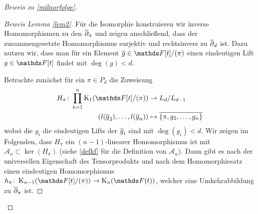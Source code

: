 \documentclass[ngerman,fontsize=11pt, paper=a4, parskip=half, titlepage=true, toc=bib]{scrartcl}
\begin{document}
\begin{proof}[Beweis zu \ref{milnorfolge}]
\begin{proof}[Beweis Lemma \ref{lem2}]
    Für die Isomorphie konstruieren wir inverse Homomorphismen 
    zu den $\overline\partial_\pi$ und zeigen anschließend, 
    dass der zusammengesetzte Homomorphismus surjektiv und
    rechtsinvers zu $\overline\partial_d$ ist.
    Dazu nutzen wir, dass man für ein Element $\ov g\in\Ftpi$ einen
    eindeutigen Lift $g\in\F[t]$ findet mit $\deg(g)<d$.
    
    Betrachte zunächst für ein $\pi\in P_d$ die Zuweisung
    \begin{align*}
      H_\pi\colon\prod_{k=1}^n \K_1(\Ftpi) 
      &\to L_d/L_{d-1}\\
      \left( l(\ov g_2),\dotsc, l(\ov g_n) \right)
      &\mapsto \ov{\{\pi,g_2,\dotsc,g_n\}}
    \end{align*}
    wobei die $g_i$ die eindeutigen Lifts der $\overline g_i$ sind mit $\deg(g_i)<d$.
    Wir zeigen im Folgenden, dass $H_\pi$ ein $(n-1)$-linearer
    Homomorphismus ist mit $\mathcal{A}_n\subset \ker(H_\pi)$ (siehe
    \ref{defkf} für die Definition von $\mathcal{A}_n$).
    Dann gibt es nach der universellen Eigenschaft des Tensorprodukts
    und nach dem Homomorphiesatz einen eindeutigen Homomorphismus 
    $h_\pi\colon\K_{n-1}(\Ftpi)\to\KnFt$,
    welcher eine Umkehrabbildung zu $\overline\partial_\pi$ ist.
    


\end{proof}
\end{proof}
\end{document}
